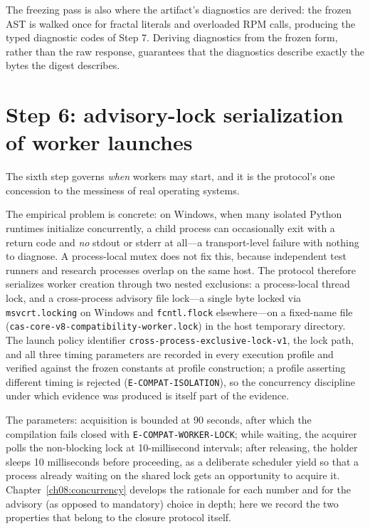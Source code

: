 \begin{remark}
The freezing pass is also where the artifact's diagnostics are derived: the frozen AST is walked once for fractal literals and overloaded RPM calls, producing the typed diagnostic codes of Step 7. Deriving diagnostics from the frozen form, rather than the raw response, guarantees that the diagnostics describe exactly the bytes the digest describes.
\end{remark}

\section{Step 6: advisory-lock serialization of worker launches}\label{ch07:step6}

The sixth step governs \emph{when} workers may start, and it is the protocol's one concession to the messiness of real operating systems.

The empirical problem is concrete: on Windows, when many isolated Python runtimes initialize concurrently, a child process can occasionally exit with a return code and \emph{no} stdout or stderr at all---a transport-level failure with nothing to diagnose. A process-local mutex does not fix this, because independent test runners and research processes overlap on the same host. The protocol therefore serializes worker creation through two nested exclusions: a process-local thread lock, and a cross-process advisory file lock---a single byte locked via \texttt{msvcrt.locking} on Windows and \texttt{fcntl.flock} elsewhere---on a fixed-name file (\texttt{cas-core-v8-compatibility-worker.lock}) in the host temporary directory. The launch policy identifier \texttt{cross-process-exclusive-lock-v1}, the lock path, and all three timing parameters are recorded in every execution profile and verified against the frozen constants at profile construction; a profile asserting different timing is rejected (\texttt{E-COMPAT-ISOLATION}), so the concurrency discipline under which evidence was produced is itself part of the evidence.

The parameters: acquisition is bounded at 90 seconds, after which the compilation fails closed with \texttt{E-COMPAT-WORKER-LOCK}; while waiting, the acquirer polls the non-blocking lock at 10-millisecond intervals; after releasing, the holder sleeps 10 milliseconds before proceeding, as a deliberate scheduler yield so that a process already waiting on the shared lock gets an opportunity to acquire it. Chapter~\ref{ch08:concurrency} develops the rationale for each number and for the advisory (as opposed to mandatory) choice in depth; here we record the two properties that belong to the closure protocol itself.

